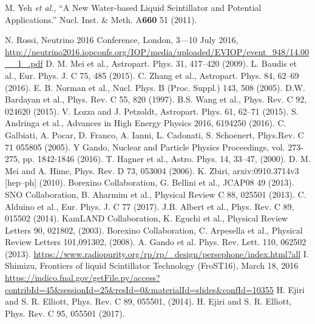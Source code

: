 \documentclass[11pt,prd,letterpaper,amsmath,amssymb,final,nofootinbib
,unsortedaddress,superscriptaddress
]{revtex4-1}
\begin{document}
\begin{thebibliography}{00}

M. Yeh {\it et al.}, { ``A New Water-based Liquid Scintillator and Potential Applications.''} 
Nucl. Inst. \& Meth. A{\bf 660} 51 (2011).


 N. Rossi, Neutrino 2016 Conference, London, 3---10 July 2016, \url{http://neutrino2016.iopconfs.org/IOP/media/uploaded/EVIOP/event_948/14.00__1_.pdf}
 D. M. Mei et al., Astropart. Phys. 31, 417–420 (2009).
 L. Baudis et al., Eur. Phys. J. C 75, 485 (2015).
 C. Zhang et al., Astropart. Phys. 84, 62--69 (2016).
 E. B. Norman et al., Nucl. Phys. B (Proc. Suppl.) 143, 508 (2005).
 D.W. Bardayan et al., Phys. Rev. C 55, 820 (1997).
 B.S. Wang et al., Phys. Rev. C 92, 024620 (2015).
  V. Lozza and J. Petzoldt, Astropart. Phys. 61, 62--71 (2015).
 S. Andringa et al., Advances in High Energy Physics 2016, 6194250 (2016).
 C. Galbiati, A. Pocar, D. Franco, A. Ianni, L. Cadonati, S. Schoenert, Phys.Rev. C 71 055805 (2005).
 Y Gando, Nuclear and Particle Physics Proceedings, vol. 273- 275, pp. 1842-1846 (2016).
 T. Hagner et al., Astro. Phys. 14, 33--47, (2000).
 D. M. Mei and A. Hime, Phys. Rev. D 73, 053004 (2006).
 K. Zbiri, arxiv:0910.3714v3 [hep--ph] (2010).
 Borexino Collaboration, G. Bellini et al., JCAP08 49 (2013).
 SNO Collaboration, B. Aharmim et al., Physical Review C 88, 025501 (2013).
 C. Alduino et al., Eur. Phys. J. C 77 (2017).
  J.B. Albert et al., Phys. Rev. C 89, 015502 (2014). 
 KamLAND Collaboration, K. Eguchi et al., Physical Review Letters 90, 021802, (2003).
 Borexino Collaboration, C. Arpesella et al., Physical Review Letters 101,091302, (2008).
 A. Gando et al. Phys. Rev. Lett. 110, 062502 (2013).
 \url{https://www.radiopurity.org/rp/rp/_design/persephone/index.html?all}
 I. Shimizu, Frontiers of liquid Scintillator Technology (FroST16), March 18, 2016
\url{https://indico.fnal.gov/getFile.py/access?contribId=45&sessionId=25&resId=0&materialId=slides&confId=10355}
 H. Ejiri and S. R. Elliott, Phys. Rev. C 89, 055501, (2014).
 H. Ejiri and S. R. Elliott, Phys. Rev. C 95, 055501 (2017).

\end{thebibliography}
\end{document}
